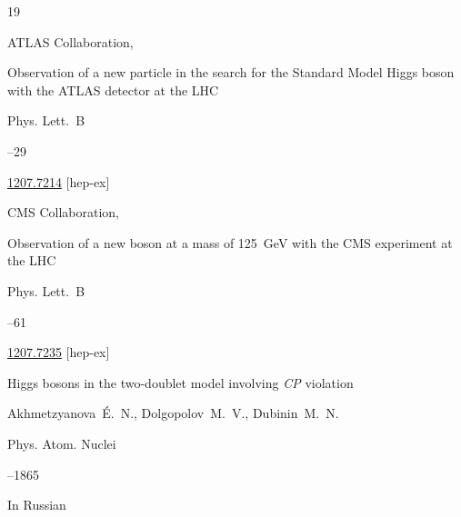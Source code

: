 \begin{thebibliography}{19}




\by ATLAS Collaboration,

\paper Observation of a new particle in the search for the Standard Model Higgs boson with the ATLAS detector at the LHC

\jour   	Phys. Lett.~B



--29


\arxiv \href{https://arxiv.org/abs/1207.7214}{1207.7214} [hep-ex]







\by CMS Collaboration,

\paper Observation of a new boson at a mass of 125~GeV with the CMS experiment at the LHC

\jour   	Phys. Lett.~B




--61


\arxiv \href{https://arxiv.org/abs/1207.7235}{1207.7235} [hep-ex]




\paper Higgs bosons in the two-doublet model involving {\it CP} violation

\by Akhmetzyanova~\'E.~N., Dolgopolov~M.~V., Dubinin~M.~N.

\jour Phys. Atom. Nuclei 




--1865






\lang In Russian


\end{thebibliography}
